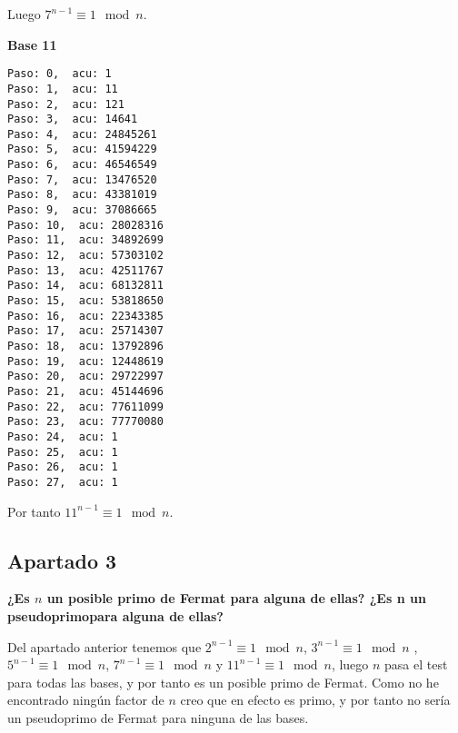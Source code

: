 \documentclass[a4paper]{article}
\begin{document}
Luego $7^{n-1}\equiv 1 \mod n$.

\textbf{Base 11}
\begin{verbatim}
Paso: 0,  acu: 1
Paso: 1,  acu: 11
Paso: 2,  acu: 121
Paso: 3,  acu: 14641
Paso: 4,  acu: 24845261
Paso: 5,  acu: 41594229
Paso: 6,  acu: 46546549
Paso: 7,  acu: 13476520
Paso: 8,  acu: 43381019
Paso: 9,  acu: 37086665
Paso: 10,  acu: 28028316
Paso: 11,  acu: 34892699
Paso: 12,  acu: 57303102
Paso: 13,  acu: 42511767
Paso: 14,  acu: 68132811
Paso: 15,  acu: 53818650
Paso: 16,  acu: 22343385
Paso: 17,  acu: 25714307
Paso: 18,  acu: 13792896
Paso: 19,  acu: 12448619
Paso: 20,  acu: 29722997
Paso: 21,  acu: 45144696
Paso: 22,  acu: 77611099
Paso: 23,  acu: 77770080
Paso: 24,  acu: 1
Paso: 25,  acu: 1
Paso: 26,  acu: 1
Paso: 27,  acu: 1
\end{verbatim}

Por tanto $11^{n-1}\equiv 1 \mod n$.

\subsection{Apartado 3}

\textbf{¿Es $n$ un posible primo de Fermat para alguna de ellas? ¿Es n un pseudoprimopara alguna de ellas?}

Del apartado anterior tenemos que $2^{n-1}\equiv 1 \mod n$, $3^{n-1}\equiv 1 \mod n$ , $5^{n-1}\equiv 1 \mod n$, $7^{n-1}\equiv 1 \mod n$ y $11^{n-1}\equiv 1 \mod n$, luego $n$ pasa el test para todas las bases, y por tanto es un posible primo de Fermat. Como no he encontrado ningún factor de $n$ creo que en efecto es primo, y por tanto no sería un pseudoprimo de Fermat para ninguna de las bases.
\end{document}
